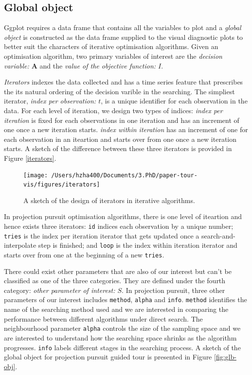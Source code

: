 \documentclass[12pt]{article}
\begin{document}
\hypertarget{global-object}{%
\subsection{Global object}\label{global-object}}

Ggplot requires a data frame that contains all the variables to plot and
a \emph{global object} is constructed as the data frame supplied to the
visual diagnostic plots to better suit the characters of iterative
optimisation algorithms. Given an optimisation algorithm, two primary
variables of interest are the \emph{decision variable: \(\mathbf{A}\)}
and the \emph{value of the objective function: \(I\)}.

\emph{Iterators} indexes the data collected and has a time series
feature that prescribes the its natural ordering of the decision varible
in the searching. The simpliest iterator, \emph{index per observation:
\(t\)}, is a unique identifier for each observation in the data. For
each level of iteration, we design two types of indices: \emph{index per
iteration} is fixed for each observations in one iteration and has an
increment of one once a new iteration starts. \emph{index within
iteration} has an increment of one for each observation in an iteartion
and starts over from one once a new iteration starts. A sketch of the
difference between these three iterators is provided in Figure
\ref{iterators}.

\begin{figure}
\texttt{[image: /Users/hzha400/Documents/3.PhD/paper-tour-vis/figures/iterators]} \caption{\label{iterators} A sketch of the design of iterators in iterative algorithms.}\label{fig:iterators}
\end{figure}

In projection pursuit optimisation algorithms, there is one level of
iteartion and hence exists three iterators: \texttt{id} indices each
observation by a unique number; \texttt{tries} is the index per
iteration iterator that gets updated once a search-and-interpolate step
is finished; and \texttt{loop} is the index within iteration iterator
and starts over from one at the beginning of a new \texttt{tries}.

There could exist other parameters that are also of our interest but
can't be classified as one of the three categories. They are defined
under the fourth category: \emph{other parameter of interest: \(S\)}. In
projection pursuit, three other parameters of our interest includes
\texttt{method}, \texttt{alpha} and \texttt{info}. \texttt{method}
identifies the name of the searching method used and we are interested
in comparing the performance between different algorithms under direct
search. The neighbourhood parameter \texttt{alpha} controls the size of
the sampling space and we are interested to understand how the searching
space shrinks as the algorithm progresses. \texttt{info} labels
different stages in the searching process. A sketch of the global object
for projection pursuit guided tour is presented in Figure
\ref{fig:glb-obj}.
\end{document}

